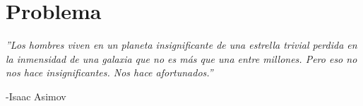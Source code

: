 \chapter{Problema}
\begin{flushright}
\item \textit{''Los hombres viven en un planeta insignificante de una estrella trivial perdida en la inmensidad de una galaxia que no es más que una entre millones. Pero eso no nos hace insignificantes. Nos hace afortunados.''}

-Isaac Asimov
\end{flushright}